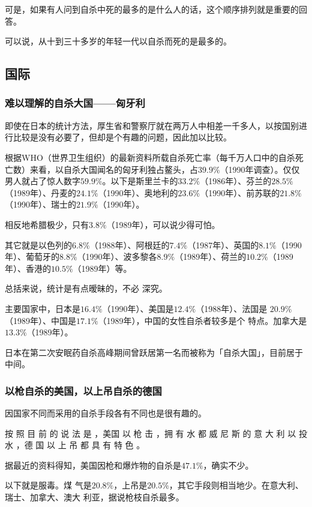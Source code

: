 \documentclass[UTF8]{ctexart}
\begin{document}
可是，如果有人问到自杀中死的最多的是什么人的话，这个顺序排列就是重要的回答。

可以说，从十到三十多岁的年轻一代以自杀而死的是最多的。

\subsection{国际}

\subsubsection*{难以理解的自杀大国——匈牙利}

即使在日本的统计方法，厚生省和警察厅就在两万人中相差一千多人，以按国别进行比较是没有必要了，但却是个有趣的问题，因此加以比较。

根据WHO（世界卫生组织）的最新资料所载自杀死亡率（每千万人口中的自杀死亡数）来看，以自杀大国闻名的匈牙利独占鳌头，占$39.9\%$（1990年调查）。仅仅男人就占了惊人数字$59.9\%$。以下是斯里兰卡的$33.2\%$（1986年）、芬兰的$28.5\%$（1989年）、丹麦的$24.1\%$（1990年）、奥地利的$23.6\%$（1990年）、前苏联的$21.8\%$（1990年）、瑞士的$21.9\%$（1990年）。

相反地希腊极少，只有$3.8\%$（1989年），可以说少得可怕。

其它就是以色列的$6.8\%$（1988年）、阿根廷的$7.4\%$（1987年）、英国的$8.1\%$（1990年）、葡萄牙的$8.8\%$（1990年）、波多黎各$8.9\%$（1989年）、荷兰的$10.2\%$（1989年）、香港的$10.5\%$（1989年）等。

总括来说，统计是有点暧昧的，不必 深究。

主要国家中，日本是$16.4\%$（1990年）、美国是$12.4\%$（1988年）、法国是 $20.9\%$（1989年）、中国是$17.1\%$（1989年），中国的女性自杀者较多是个 特点。加拿大是$13.3\%$（1989年）。

日本在第二次安眠药自杀高峰期间曾跃居第一名而被称为「自杀大国」，目前居于中间。

\subsubsection*{以枪自杀的美国，以上吊自杀的德国}

因国家不同而采用的自杀手段各有不同也是很有趣的。

按 照 目 前 的 说 法 是 ，美国 以 枪 击 ，拥 有 水 都 威 尼 斯 的 意 大 利 以 投 水 ，德 国 以 上 吊 都 具 有 特 色 。

据最近的资料得知，美国因枪和爆炸物的自杀是$47.1\%$，确实不少。

以下就是服毒。煤 气是$20.8\%$，上吊是$20.5\%$，其它手段则相当地少。在意大利、瑞士、加拿大、澳大 利亚，据说枪枝自杀最多。
\end{document}
